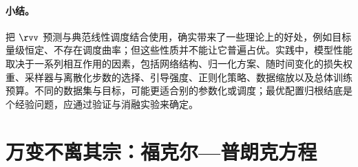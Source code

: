 \paragraph{小结。}
把 $\rvv$ 预测与典范线性调度结合使用，确实带来了一些理论上的好处，例如目标量级恒定、不存在调度曲率；但这些性质并不能让它普遍占优。实践中，模型性能取决于一系列相互作用的因素，包括网络结构、归一化方案、随时间变化的损失权重、采样器与离散化步数的选择、引导强度、正则化策略、数据缩放以及总体训练预算。不同的数据集与目标，可能更适合别的参数化或调度；最优配置归根结底是个经验问题，应通过验证与消融实验来确定。


\section{万变不离其宗：福克尔—普朗克方程}\label{sec:comparison-connection}


